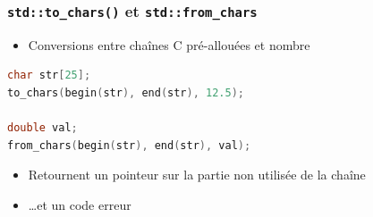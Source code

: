 \documentclass[C++.tex]{subfiles}
\begin{document}
\begin{frame}[fragile]
	\frametitle{\lstinline|std::to_chars()| et \lstinline|std::from_chars|}
	\begin{itemize}
		\item Conversions entre chaînes C pré-allouées et nombre
	\end{itemize}
	
	\begin{lstlisting}[language=C++]
char str[25];
to_chars(begin(str), end(str), 12.5);

double val;
from_chars(begin(str), end(str), val);\end{lstlisting}

	\begin{itemize}
		\item Retournent un pointeur sur la partie non utilisée de la chaîne


		\item \ldots et un code erreur
	\end{itemize}
\end{frame}
\end{document}

